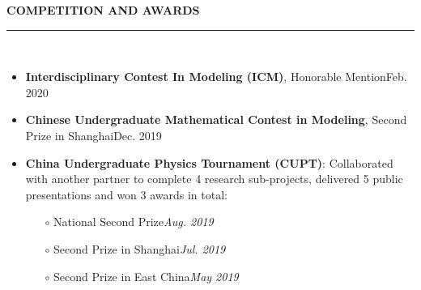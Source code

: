 \documentclass[letterpaper,11pt]{article}
\begin{document}
{\Large\bfseries{}COMPETITION AND AWARDS}\\
\rule[1.5ex]{\columnwidth}{1pt}\\
\vspace{-5ex}
\begin{itemize}
    \item {\bfseries{}Interdisciplinary Contest In Modeling (ICM)}, {Honorable Mention}\hfill{Feb. 2020}
    \item {\bfseries{}Chinese Undergraduate Mathematical Contest in Modeling}, {Second Prize in Shanghai}\hfill{Dec. 2019}
    \item {\bfseries{}China Undergraduate Physics Tournament (CUPT)}: Collaborated with another partner to complete 4 research sub-projects, delivered 5 public presentations and won 3 awards in total:
    \begin{itemize}
        \item[$\circ$] {National Second Prize}\hfill{\itshape{}Aug. 2019}
        \item[$\circ$] {Second Prize in Shanghai}\hfill{\itshape{}Jul. 2019}
        \item[$\circ$] {Second Prize in East China}\hfill{\itshape{}May 2019}
    \end{itemize}
\end{itemize}
\end{document}
